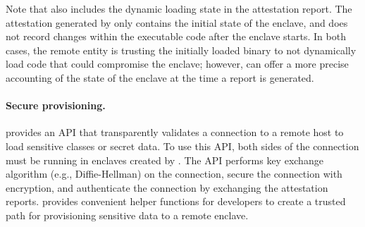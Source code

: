 Note that \sysname{} also includes
the dynamic loading state in the attestation report.
The attestation generated by \sgx{} only contains
the initial state of the enclave, and does not record changes within the executable code
after the enclave starts. 
In both cases, the remote entity is trusting the initially loaded binary
to not dynamically load code that could compromise the enclave;
however, \sysname{} can offer a more precise accounting of the state of the enclave 
at the time a report is generated.




\paragraph{Secure provisioning.}
\sysname{} provides an API that transparently validates a connection to a remote host to load
sensitive classes or secret data.
To use this API, both sides of the connection
must be running in enclaves created by \sysname{}.
The API performs key exchange algorithm (e.g., Diffie-Hellman) on the connection,
secure the connection with encryption,
and authenticate the connection by exchanging the attestation reports.
\sysname{} provides convenient helper functions for developers to create a trusted path
for provisioning sensitive data to a remote enclave.


